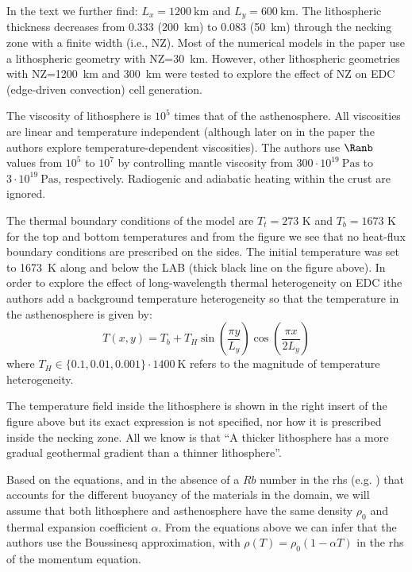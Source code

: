 In the text we further find: $L_x=1200~\si{\km}$ and $L_y=600~\si{\km}$.
The lithospheric thickness decreases from
0.333 (200~\si{\km}) to 0.083 (50~\si{\km}) through the necking zone with a finite
width (i.e., NZ).
Most of the numerical models in the paper use a lithospheric
geometry with NZ=30~\si{km}. However, other lithospheric geometries 
with NZ=1200~\si{\km} and 300~\si{\km} were tested to
explore the effect of NZ on EDC (edge-driven convection) cell generation.

The viscosity of lithosphere is $10^5$ times that of the asthenosphere.
All viscosities are linear and temperature independent (although 
later on in the paper the authors explore temperature-dependent viscosities).
The authors use $\Ranb$ values from $10^5$ to
$10^7$ by controlling mantle viscosity from $300\cdot 10^{19}~\si{\pascal\second}$ to
$3\cdot 10^{19}~\si{\pascal\second}$, respectively. Radiogenic and 
adiabatic heating within the crust are ignored.

The thermal boundary conditions of the model are $T_t=273$ K
and $T_b=1673$ K for the top and bottom temperatures
and from the figure we see that no heat-flux boundary conditions are
prescribed on the sides.
The initial temperature was set to 1673~K along and below the LAB
(thick black line on the figure above).
In order to explore the effect of long-wavelength thermal heterogeneity 
on EDC ithe authors add a background temperature heterogeneity 
so that the temperature in the asthenosphere is given by:
\[
T(x,y)=T_b + T_H \sin\left(\frac{\pi y}{L_y}\right) \cos \left(\frac{\pi x}{2 L_y} \right)
\]
where $T_H\in \{0.1,0.01,0.001 \}\cdot 1400~\si{\kelvin}$ 
refers to the magnitude of temperature heterogeneity.

The temperature field inside the lithosphere is shown in the right 
insert of the figure above but its exact expression is not specified,
nor how it is prescribed inside the necking zone.
All we know is that ``A thicker lithosphere has a
more gradual geothermal gradient than a thinner lithosphere''.

Based on the equations, and in the absence of a $Rb$ number in the 
rhs (e.g. \cite{chsg14}) that accounts for the different buoyancy of the 
materials in the domain, we will assume that both lithosphere and 
asthenosphere have the same density $\rho_0$ and thermal expansion 
coefficient $\alpha$. From the equations above we can infer that the 
authors use the Boussinesq approximation, with $\rho(T)=\rho_0(1-\alpha T)$ 
in the rhs of the momentum equation.

